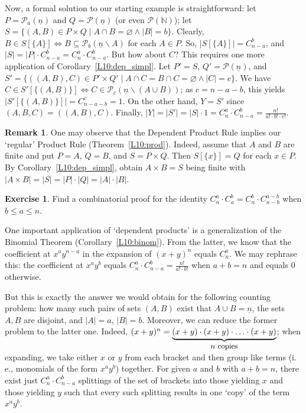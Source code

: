 \documentclass[12pt,notitlepage]{article}
\theoremstyle{plain}
\theoremstyle{definition}
\newtheorem{exc}[thm]{Exercise}
\newtheorem{rem}[thm]{Remark}
\theoremstyle{plain}
\newcommand{\N}{\mathbb{N}}
\newcommand{\sbs}{\subseteq}
\renewcommand{\setminus}{\smallsetminus}
\newcommand{\void}{\varnothing}
\newcommand{\mP}{\mathcal{P}}
\newcommand{\ul}[1]{\underline{#1}}
\newcommand{\1}{\mathbf{1}}
\newcommand{\0}{\mathbf{0}}
\begin{document}
Now, a formal solution to our starting example is straightforward:  let $P = \mP_a(\ul{n})$ and $Q = \mP(\ul{n})$ (or even $\mP(\N)$); let $S = \{ (A, B) \in P \times Q \mid A \cap B = \void \wedge |B| = b \}$. Clearly, $B \in S[\{A\}] \iff B \sbs \mP_b (\ul{n} \setminus A)$ for each $A \in P$. So, $|S[\{A\}]| = C_{n - a}^b$, and $|S| = |P| \cdot C_{n - a}^b = C_n^a \cdot C_{n - a}^b$. But how about $C$? This requires one more application of Corollary~\ref{L10:dep_simpl}. Let $P' = S$, $Q' = \mP(\ul{n})$, and $S' = \{ ((A, B), C) \in P' \times Q' \mid A \cap C = B \cap C = \void \wedge |C| = c \}$. We have $C \in S'[\{(A, B)\}] \iff C \in \mP_c(\ul{n} \setminus (A \cup B))$; as $c = n - a - b$, this yields $|S'[\{(A, B)\}]| = C^c_{n - a - b} = 1$. On the other hand, $Y = S'$ since $(A, B, C) = ((A, B), C)$. Finally, $|Y| = |S'|= |S| \cdot 1 = C_n^a \cdot C_{n - a}^b = \frac{n!}{a! \cdot b! \cdot c!}$.

\begin{rem}
One may observe that the Dependent Product Rule implies our `regular' Product Rule (Theorem~\ref{L10:prod}). Indeed, assume that $A$ and $B$ are finite and put $P = A$, $Q = B$, and $S = P \times Q$. Then $S[\{x\}] = Q$ for each $x \in P$. By Corollary~\ref{L10:dep_simpl}, obtain $A \times B = S$ being finite with $|A \times B| = |S| = |P| \cdot |Q| = |A| \cdot |B|$.
\end{rem}

\begin{exc}
Find a combinatorial proof for the identity $C_n^a \cdot C_a^b = C_n^b \cdot C_{n - b}^{a - b}$ when $b \leq a \leq n$.
\end{exc}

One important application of `dependent products' is a generalization of the Binomial Theorem (Corollary~\ref{L10:binom}). From the latter, we know that the coefficient at $x^a y^{n - a}$ in the expansion of $(x + y)^n$ equals $C_n^a$. We may rephrase this:  the coefficient at $x^a y^b$ equals $C_n^a \cdot C_{n - a}^b = \frac{n!}{a! \cdot b!}$ when $a + b = n$ and equals $0$ otherwise.

But this is exactly the answer we would obtain for the following counting problem: how many such pairs of sets $(A, B)$ exist that $A \cup B = \ul{n}$, the sets $A, B$ are disjoint, and $|A| = a$, $|B| = b$. Moreover, we can reduce the former problem to the latter one. Indeed, $(x + y)^n = \underbrace{(x + y) \cdot (x + y) \cdot \ldots \cdot (x + y)}_{\small\mbox{$n$ copies}}$; when expanding, we take either $x$ or $y$ from each bracket and then group like terms (i.\,e., monomials of the form $x^a y^b$) together. For given $a$ and $b$ with $a + b = n$, there exist just $C^a_n \cdot C_{n - a}^b$ splittings of the set of brackets into those yielding $x$ and those yielding $y$ such that every such splitting results in one `copy' of the term $x^a y^b$.
\end{document}

